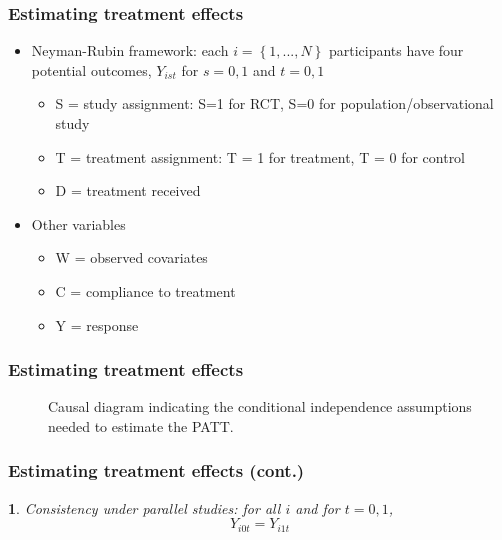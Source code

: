 \documentclass{beamer}
\makeatletter
\newtheorem*{assumption*}{\assumptionnumber}
\providecommand{\assumptionnumber}{}
\newenvironment{assumption}[2]
 {%
  \renewcommand{\assumptionnumber}{Assumption #1}%
  \begin{assumption*}%
  \protected@edef\@currentlabel{#1}%
 }
 {%
  \end{assumption*}
 }
\makeatother
\begin{document}
\begin{frame}
\frametitle{Estimating treatment effects}
\begin{itemize}
\item Neyman-Rubin framework: each $i = \left\{1, ..., N \right\}$ participants have four potential outcomes, $Y_{ist}$ for $s = 0,1$ and $t = 0,1$
\begin{itemize}
\item S = study assignment: S=1 for RCT, S=0 for population/observational study
\item T = treatment assignment: T = 1 for treatment, T = 0 for control
\item D = treatment received
\end{itemize}
\item Other variables
\begin{itemize}
\item W = observed covariates
\item C = compliance to treatment
\item Y = response
\end{itemize}
\end{itemize}
\end{frame}


\begin{frame}
\frametitle{Estimating treatment effects}
\begin{figure}[h]
\caption{Causal diagram indicating the conditional independence assumptions needed to estimate the PATT.}\label{fig:DAG}
\end{figure}

\end{frame}

\begin{frame}
\frametitle{Estimating treatment effects (cont.)}
\begin{assumption}{1}{}\label{consistency}
Consistency under parallel studies: for all $i$ and for $t=0, 1$,
$$Y_{i0t} = Y_{i1t}$$
\end{assumption}
\end{frame}
\end{document}
